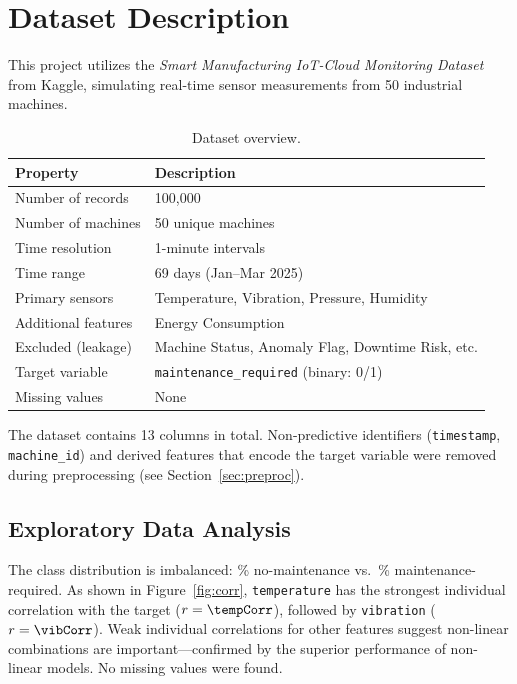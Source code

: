 \documentclass[11pt]{article}
\begin{document}
\section{Dataset Description}

This project utilizes the \textit{Smart Manufacturing IoT-Cloud Monitoring Dataset} from Kaggle, simulating real-time sensor measurements from 50 industrial machines.

\begin{table}[H]
\centering
\caption{Dataset overview.}
\label{tab:dataset}
\begin{tabular}{ll}
\toprule
\textbf{Property} & \textbf{Description} \\
\midrule
Number of records & 100,000 \\
Number of machines & 50 unique machines \\
Time resolution & 1-minute intervals \\
Time range & 69 days (Jan--Mar 2025) \\
Primary sensors & Temperature, Vibration, Pressure, Humidity \\
Additional features & Energy Consumption \\
Excluded (leakage) & Machine Status, Anomaly Flag, Downtime Risk, etc. \\
Target variable & \texttt{maintenance\_required} (binary: 0/1) \\
Missing values & None \\
\bottomrule
\end{tabular}
\end{table}

The dataset contains 13 columns in total. Non-predictive identifiers (\texttt{timestamp}, \texttt{machine\_id}) and derived features that encode the target variable were removed during preprocessing (see Section~\ref{sec:preproc}).

\subsection{Exploratory Data Analysis}

The class distribution is imbalanced: \noMaintPct\% no-maintenance vs.\ \maintPct\% maintenance-required. As shown in Figure~\ref{fig:corr}, \texttt{temperature} has the strongest individual correlation with the target ($r = \tempCorr$), followed by \texttt{vibration} ($r = \vibCorr$). Weak individual correlations for other features suggest non-linear combinations are important---confirmed by the superior performance of non-linear models. No missing values were found.
\end{document}
